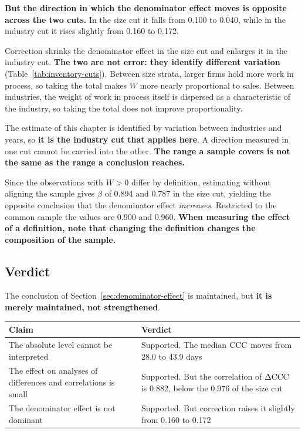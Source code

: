 \textbf{But the direction in which the denominator effect moves is opposite across the two cuts.}
In the size cut it falls from 0.100 to 0.040, while in the industry cut it rises slightly from
0.160 to 0.172.

\begin{remark}
\label{rem:inventory-cut}
Correction shrinks the denominator effect in the size cut and enlarges it in the industry cut.
\textbf{The two are not error: they identify different variation}
(Table~\ref{tab:inventory-cuts}). Between size strata, larger firms hold more work in process, so
taking the total makes $W$ more nearly proportional to sales. Between industries, the weight of
work in process itself is dispersed as a characteristic of the industry, so taking the total does
not improve proportionality.

The estimate of this chapter is identified by variation between industries and years, so
\textbf{it is the industry cut that applies here}. A direction measured in one cut cannot be
carried into the other. \textbf{The range a sample covers is not the same as the range a
conclusion reaches.}
\end{remark}

\begin{remark}
\label{rem:common-sample}
Since the observations with $W>0$ differ by definition, estimating without aligning the sample
gives $\beta$ of 0.894 and 0.787 in the size cut, yielding the opposite conclusion that the
denominator effect \emph{increases}. Restricted to the common sample the values are 0.900 and
0.960. \textbf{When measuring the effect of a definition, note that changing the definition
changes the composition of the sample.}
\end{remark}

\subsection{Verdict}

The conclusion of Section~\ref{sec:denominator-effect} is maintained, but
\textbf{it is merely maintained, not strengthened}.

\begin{center}
\begin{tabularx}{\textwidth}{@{}Xl@{}}
\toprule
Claim & Verdict \\
\midrule
The absolute level cannot be interpreted & Supported. The median $\mathrm{CCC}$ moves from 28.0 to 43.9 days \\
The effect on analyses of differences and correlations is small & Supported. But the correlation of $\Delta\mathrm{CCC}$ is 0.882, below the 0.976 of the size cut \\
The denominator effect is not dominant & Supported. But correction raises it slightly from 0.160 to 0.172 \\
\bottomrule
\end{tabularx}
\label{tab:inventory-verdict}
\end{center}

